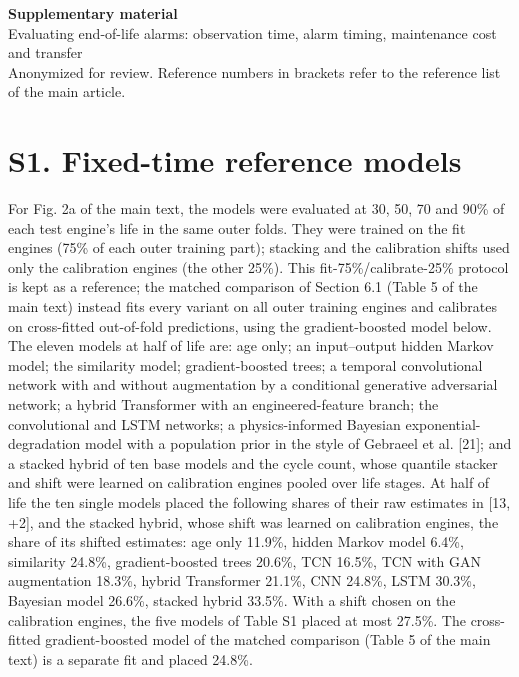\documentclass[11pt,a4paper]{article}
\begin{document}
\begin{center}{\Large\bfseries Supplementary material}\\[6pt]{\large Evaluating end-of-life alarms: observation time, alarm timing, maintenance cost and transfer}\\[6pt]{\small Anonymized for review. Reference numbers in brackets refer to the reference list of the main article.}\end{center}
\section*{S1. Fixed-time reference models}

\noindent For Fig. 2a of the main text, the models were evaluated at 30, 50, 70 and 90\% of each test engine's life in the same outer folds. They were trained on the fit engines (75\% of each outer training part); stacking and the calibration shifts used only the calibration engines (the other 25\%). This fit-75\%/calibrate-25\% protocol is kept as a reference; the matched comparison of Section 6.1 (Table 5 of the main text) instead fits every variant on all outer training engines and calibrates on cross-fitted out-of-fold predictions, using the gradient-boosted model below. The eleven models at half of life are: age only; an input--output hidden Markov model; the similarity model; gradient-boosted trees; a temporal convolutional network with and without augmentation by a conditional generative adversarial network; a hybrid Transformer with an engineered-feature branch; the convolutional and LSTM networks; a physics-informed Bayesian exponential-degradation model with a population prior in the style of Gebraeel et al. [21]; and a stacked hybrid of ten base models and the cycle count, whose quantile stacker and shift were learned on calibration engines pooled over life stages. At half of life the ten single models placed the following shares of their raw estimates in [\textminus{}13, +2], and the stacked hybrid, whose shift was learned on calibration engines, the share of its shifted estimates: age only 11.9\%, hidden Markov model 6.4\%, similarity 24.8\%, gradient-boosted trees 20.6\%, TCN 16.5\%, TCN with GAN augmentation 18.3\%, hybrid Transformer 21.1\%, CNN 24.8\%, LSTM 30.3\%, Bayesian model 26.6\%, stacked hybrid 33.5\%. With a shift chosen on the calibration engines, the five models of Table S1 placed at most 27.5\%. The cross-fitted gradient-boosted model of the matched comparison (Table 5 of the main text) is a separate fit and placed 24.8\%.
\end{document}
